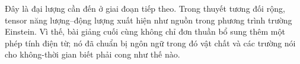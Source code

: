 Đây là đại lượng cần đến ở giai đoạn tiếp theo. Trong thuyết tương đối rộng,
tensor năng lượng--động lượng xuất hiện như nguồn trong phương trình trường Einstein. Vì thế, bài giảng cuối cùng không chỉ đơn thuần bổ sung thêm một
phép tính điện từ; nó đã chuẩn bị ngôn ngữ trong đó vật chất và các trường nói cho không-thời gian biết phải cong như thế nào.
